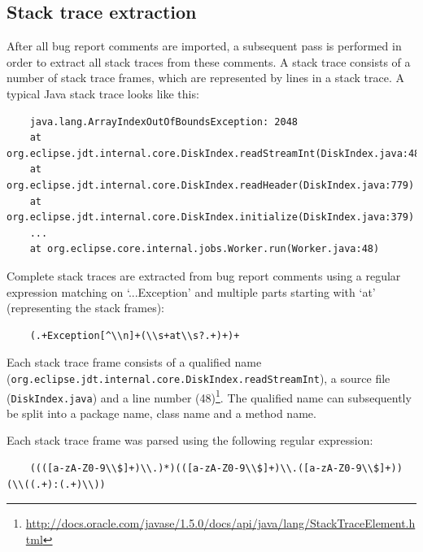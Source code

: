 \subsection{Stack trace extraction} %
\label{sub:stack_trace_extraction}
After all bug report comments are imported, a subsequent pass is performed in order to extract all stack traces from these comments. A stack trace consists of a number of stack trace frames, which are represented by lines in a stack trace. A typical Java stack trace looks like this:

{\small
\begin{verbatim}
	java.lang.ArrayIndexOutOfBoundsException: 2048 	
	at org.eclipse.jdt.internal.core.DiskIndex.readStreamInt(DiskIndex.java:48)
	at org.eclipse.jdt.internal.core.DiskIndex.readHeader(DiskIndex.java:779)
	at org.eclipse.jdt.internal.core.DiskIndex.initialize(DiskIndex.java:379)
	...
	at org.eclipse.core.internal.jobs.Worker.run(Worker.java:48)
\end{verbatim}
}

Complete stack traces are extracted from bug report comments using a regular expression matching on `...Exception' and multiple parts starting with `at' (representing the stack frames):

{\small
\begin{verbatim}
	(.+Exception[^\\n]+(\\s+at\\s?.+)+)+
\end{verbatim}
}

\begin{sloppypar}
Each stack trace frame consists of a qualified name (\texttt{org.eclipse.jdt.internal.core.DiskIndex.readStreamInt}), a source file (\texttt{DiskIndex.java}) and a line number (48)\footnote{\url{http://docs.oracle.com/javase/1.5.0/docs/api/java/lang/StackTraceElement.html}}. The qualified name can subsequently be split into a package name, class name and a method name. 
\end{sloppypar}

Each stack trace frame was parsed using the following regular expression:
{\small
\begin{verbatim}
	((([a-zA-Z0-9\\$]+)\\.)*)(([a-zA-Z0-9\\$]+)\\.([a-zA-Z0-9\\$]+))(\\((.+):(.+)\\))
\end{verbatim}
}

